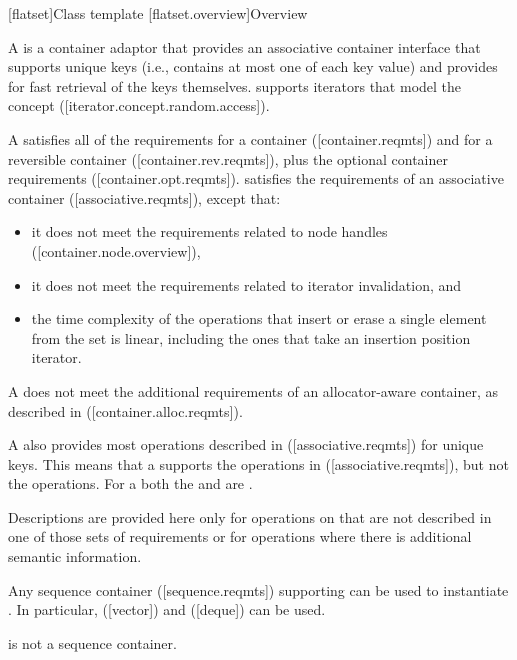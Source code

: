 \noindent\makebox[\linewidth]{\rule{\textwidth}{0.4pt}}

\begin{addedblock}
[flatset]{Class template }
[flatset.overview]{Overview}

\pnum
{}%
A  is a container adaptor that provides an associative
container interface that supports unique keys (i.e., contains at most one of
each key value) and provides for fast retrieval of the keys
themselves.  supports iterators that model
the  concept
([iterator.concept.random.access]).

\pnum
A  satisfies all of the requirements for a container
([container.reqmts]) and for a reversible container ([container.rev.reqmts]),
plus the optional container requirements ([container.opt.reqmts]).  
satisfies the requirements of an associative container ([associative.reqmts]), except that:
\begin{itemize}
\item it does not meet the requirements related to node handles ([container.node.overview]),
\item it does not meet the requirements related to iterator invalidation, and
\item the time complexity of the operations that insert or erase a single
element from the set is linear, including the ones that take an insertion
position iterator.
\end{itemize}
\begin{note}A  does not meet the additional requirements of an
allocator-aware container, as described in ([container.alloc.reqmts]).\end{note}

\pnum
A  also provides most operations described
in ([associative.reqmts]) for unique keys.  This means that a
 supports the  operations
in ([associative.reqmts]), but not the  operations.  For a
 both the  and  are
.

\pnum
Descriptions are provided here only for operations on  that
are not described in one of those sets of requirements or for operations where
there is additional semantic information.

\pnum
Any sequence container ([sequence.reqmts]) supporting 
can be used to instantiate . In particular, 
([vector]) and  ([deque]) can be
used.  \begin{note} is not a sequence container.\end{note}


\end{addedblock}
